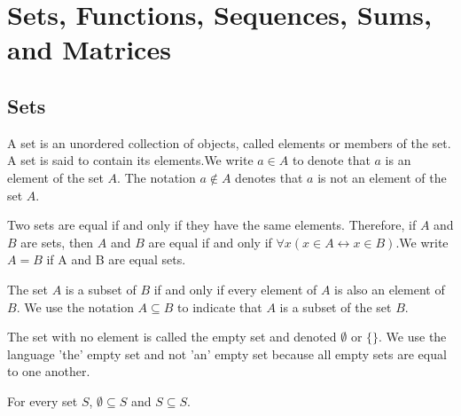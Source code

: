 \section{Sets, Functions, Sequences, Sums, and Matrices}
\subsection{Sets}

\begin{defn}[Set]
A set is an unordered collection of objects, called elements or members of the set. A set is
said to contain its elements.We write $a \in A$ to denote that $a$ is an element of the set $A$. The
notation $a \notin A$ denotes that $a$ is not an element of the set $A$.
\end{defn}
\begin{defn}[Equality]
Two sets are equal if and only if they have the same elements. Therefore, if $A$ and $B$ are sets,
then $A$ and $B$ are equal if and only if $\forall x(x \in A \leftrightarrow x \in B)$.We write $A = B$ if A and B are
equal sets.
\end{defn}
\begin{defn}[Subset]
The set $A$ is a subset of $B$ if and only if every element of $A$ is also an element of $B$. We use
the notation $A \subseteq B$ to indicate that $A$ is a subset of the set $B$.
\end{defn}
\begin{defn}
The set with no element is called the empty set and denoted $\emptyset$ or $\{\}$. We use the language 'the' empty set and not 'an' empty set because all empty sets are equal to one another.
\end{defn}
\begin{thm}
For every set $S$, $\emptyset \subseteq S$ and $S \subseteq S$.
\end{thm}

